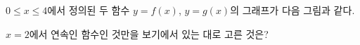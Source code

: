 $0\le x\le 4$에서 정의된 두 함수 $y=f(x)$, $y=g(x)$의 그래프가 다음 그림과 같다.\par\smallskip\dispeq{}\par\smallskip\noindent $x=2$에서 연속인 함수인 것만을 보기에서 있는 대로 고른 것은?
